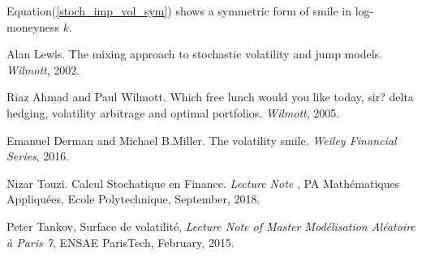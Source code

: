 \documentclass[10pt]{article}
\theoremstyle{plain}
\numberwithin{equation}{section}
\numberwithin{table}{section}
\begin{document}
Equation(\ref{stoch_imp_vol_sym}) shows a symmetric form of smile in log-moneyness $k$.






\begin{appendix}


\end{appendix}
\newpage

\begin{thebibliography}{99}

 Alan Lewis. The mixing approach to stochastic volatility and jump models. {\it
Wilmott}, 2002.

 Riaz Ahmad and Paul Wilmott. Which free lunch would you like today, sir? delta hedging, volatility arbitrage and optimal portfolios. {\it
Wilmott}, 2005.
    
 Emanuel Derman and Michael B.Miller. The volatility smile. {\it
Weiley Financial Series}, 2016.

 Nizar Touzi. Calcul Stochatique en Finance. {\it
Lecture Note} {\bf}, PA Math\'ematiques Appliqu\'ees, Ecole Polytechnique, September, 2018.

 Peter Tankov, Surface de volatilit\'e, {\it
Lecture Note of Master Mod\'elisation Al\'eatoire \`a Paris 7}, ENSAE ParisTech, February, 2015.

\end{thebibliography}
\end{document}
